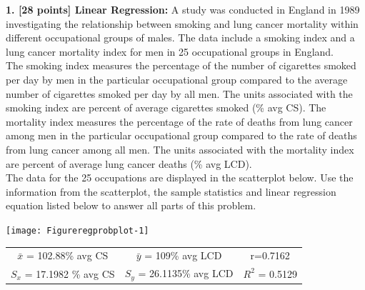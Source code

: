 \documentclass[11pt]{isuthesis}\usepackage[]{graphicx}\usepackage[]{color}
\newenvironment{knitrout}{}{} %
\begin{document}
\begin{appendices}

\textbf{1. [28 points] Linear Regression:} A study was conducted in England in 1989 investigating the relationship between smoking and lung cancer mortality within different occupational groups of males. The data include a smoking index and a lung cancer mortality index for men in 25 occupational groups in England. \\
\indent The smoking index measures the percentage of the number of cigarettes smoked per day by men in the particular occupational group compared to the average number of cigarettes smoked per day by all men. The units associated with the smoking index are percent of average cigarettes smoked (\% avg CS).  The mortality index measures the percentage of the rate of deaths from lung cancer among men in the particular occupational group compared to the rate of deaths from lung cancer among all men. The units associated with the mortality index are percent of average lung cancer deaths (\% avg LCD).  \\
\indent The data for the 25 occupations are displayed in the scatterplot below. Use the information from the scatterplot, the sample statistics and linear regression equation listed below to answer all parts of this problem. \\
\begin{knitrout}
\color{fgcolor}

{\centering \texttt{[image: Figureregprobplot-1]} 

}



\end{knitrout}
\begin{table}[hbtp]\centering 
\begin{tabular}{ |c|c|c|}
  \hline                        
 $\bar{x}$ = 102.88\% avg CS & $\bar{y}$ = 109\% avg LCD & r=0.7162\\
 $S_x$ = 17.1982 \% avg CS & $S_y$ = 26.1135\% avg LCD & $R^2$ = 0.5129\\
  \hline  
\end{tabular}
\end{table}


\end{appendices}
\end{document}
